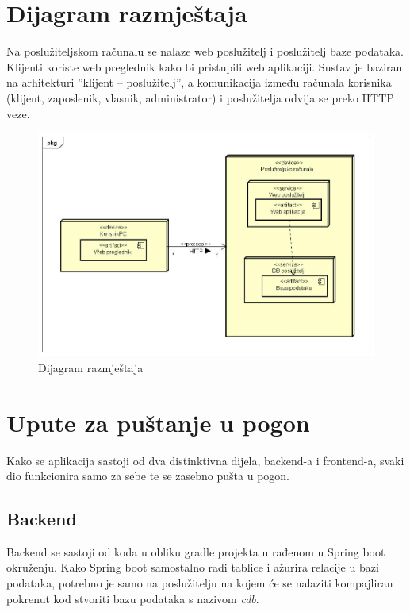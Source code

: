 			\eject 
		
		
		\section{Dijagram razmještaja}
			
			{ Na poslužiteljskom računalu se nalaze web poslužitelj i poslužitelj baze podataka. Klijenti koriste web
			preglednik kako bi pristupili web aplikaciji. Sustav je baziran na arhitekturi ”klijent – poslužitelj”, a
			komunikacija između računala korisnika (klijent, zaposlenik, vlasnik, administrator) i poslužitelja odvija se preko HTTP veze. }

			\begin{figure}[H]
				\includegraphics[width=\textwidth]{slike/Dijagram razmjestaja}
				\centering
				\caption{Dijagram razmještaja}
				\label{fig:razmijestaja}
			\end{figure}

			\eject 
		
		\section{Upute za puštanje u pogon}
		
            {Kako se aplikacija sastoji od dva distinktivna dijela, backend-a i frontend-a, svaki dio funkcionira samo za sebe te se zasebno pušta u pogon.}

			\subsection{Backend}

                {Backend se sastoji od koda u obliku gradle projekta u rađenom u Spring boot okruženju. Kako Spring boot samostalno radi tablice i ažurira relacije u bazi podataka, potrebno je samo na poslužitelju na kojem će se nalaziti kompajliran pokrenut kod stvoriti bazu podataka s nazivom \textit{cdb}.}
                
